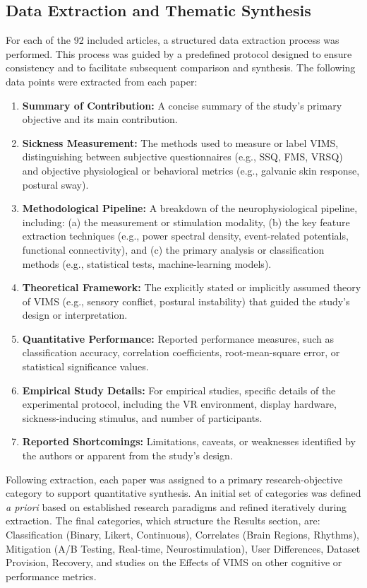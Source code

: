 \subsection{Data Extraction and Thematic Synthesis}
For each of the 92 included articles, a structured data extraction process was performed.
This process was guided by a predefined protocol designed to ensure consistency and to facilitate subsequent comparison and synthesis.
The following data points were extracted from each paper:
\begin{enumerate}
    \item \textbf{Summary of Contribution:} A concise summary of the study's primary objective and its main contribution.
    \item \textbf{Sickness Measurement:} The methods used to measure or label VIMS, distinguishing between subjective questionnaires (e.g., SSQ, FMS, VRSQ) and objective physiological or behavioral metrics (e.g., galvanic skin response, postural sway).
    \item \textbf{Methodological Pipeline:} A breakdown of the neurophysiological pipeline, including: (a) the measurement or stimulation modality, (b) the key feature extraction techniques (e.g., power spectral density, event-related potentials, functional connectivity), and (c) the primary analysis or classification methods (e.g., statistical tests, machine-learning models).
    \item \textbf{Theoretical Framework:} The explicitly stated or implicitly assumed theory of VIMS (e.g., sensory conflict, postural instability) that guided the study's design or interpretation.
    \item \textbf{Quantitative Performance:} Reported performance measures, such as classification accuracy, correlation coefficients, root-mean-square error, or statistical significance values.
    \item \textbf{Empirical Study Details:} For empirical studies, specific details of the experimental protocol, including the VR environment, display hardware, sickness-inducing stimulus, and number of participants.
    \item \textbf{Reported Shortcomings:} Limitations, caveats, or weaknesses identified by the authors or apparent from the study's design.
\end{enumerate}

Following extraction, each paper was assigned to a primary research-objective category to support quantitative synthesis.
An initial set of categories was defined \textit{a priori} based on established research paradigms and refined iteratively during extraction.
The final categories, which structure the Results section, are: Classification (Binary, Likert, Continuous), Correlates (Brain Regions, Rhythms), Mitigation (A/B Testing, Real-time, Neurostimulation), User Differences, Dataset Provision, Recovery, and studies on the Effects of VIMS on other cognitive or performance metrics.
